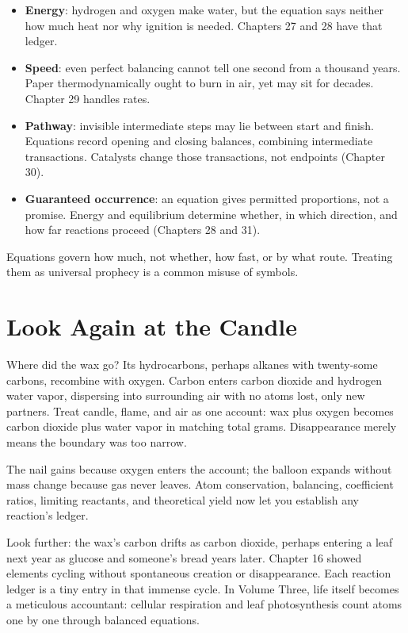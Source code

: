 \begin{itemize}[itemsep=2pt]
\item \textbf{Energy}: hydrogen and oxygen make water, but the equation says neither how much heat nor why ignition is needed. Chapters 27 and 28 have that ledger.
\item \textbf{Speed}: even perfect balancing cannot tell one second from a thousand years. Paper thermodynamically ought to burn in air, yet may sit for decades. Chapter 29 handles rates.
\item \textbf{Pathway}: invisible intermediate steps may lie between start and finish. Equations record opening and closing balances, combining intermediate transactions. Catalysts change those transactions, not endpoints (Chapter 30).
\item \textbf{Guaranteed occurrence}: an equation gives permitted proportions, not a promise. Energy and equilibrium determine whether, in which direction, and how far reactions proceed (Chapters 28 and 31).
\end{itemize}

Equations govern how much, not whether, how fast, or by what route. Treating them as universal prophecy is a common misuse of symbols.

\section{Look Again at the Candle}

Where did the wax go? Its hydrocarbons, perhaps alkanes with twenty-some carbons, recombine with oxygen. Carbon enters carbon dioxide and hydrogen water vapor, dispersing into surrounding air with no atoms lost, only new partners. Treat candle, flame, and air as one account: wax plus oxygen becomes carbon dioxide plus water vapor in matching total grams. Disappearance merely means the boundary was too narrow.

The nail gains because oxygen enters the account; the balloon expands without mass change because gas never leaves. Atom conservation, balancing, coefficient ratios, limiting reactants, and theoretical yield now let you establish any reaction's ledger.

Look further: the wax's carbon drifts as carbon dioxide, perhaps entering a leaf next year as glucose and someone's bread years later. Chapter 16 showed elements cycling without spontaneous creation or disappearance. Each reaction ledger is a tiny entry in that immense cycle. In Volume Three, life itself becomes a meticulous accountant: cellular respiration and leaf photosynthesis count atoms one by one through balanced equations.

